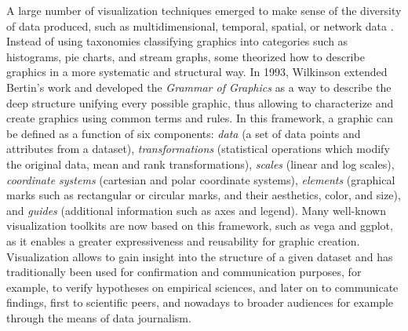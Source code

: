 A large number of visualization techniques emerged to make sense of the diversity of data produced, such as multidimensional, temporal, spatial, or network data \cite{shneidermanEyesHaveIt1996}.
Instead of using taxonomies classifying graphics into categories such as histograms, pie charts, and stream graphs, some theorized how to describe graphics in a more systematic and structural way.
In 1993, Wilkinson extended Bertin's work and developed the \textit{Grammar of Graphics} \cite{wilkinsonGrammarGraphics2005} as a way to describe the deep structure unifying every possible graphic, thus allowing to characterize and create graphics using common terms and rules.
In this framework, a graphic can be defined as a function of six components: \textsl{data} (a set of data points and attributes from a dataset), \textsl{transformations} (statistical operations which modify the original data, \eg mean and rank transformations),  \textsl{scales} (\eg linear and log scales),  \textsl{coordinate systems} (\eg cartesian and polar coordinate systems), \textsl{elements} (graphical marks such as rectangular or circular marks, and their aesthetics, \eg color, and size), and \textsl{guides} (additional information such as axes and legend).
Many well-known visualization toolkits are now based on this framework, such as vega\cite{satyanarayan2016vega} and ggplot\cite{wickham2007ggplot}, as it enables a greater expressiveness and reusability for graphic creation.
Visualization allows to gain insight into the structure of a given dataset and has traditionally been used for confirmation and communication purposes\cite{shneidermanInventingDiscoveryTools2002}, for example, to verify hypotheses on empirical sciences, and later on to communicate findings, first to scientific peers, and nowadays to broader audiences for example through the means of data journalism\cite{bradshawDataJournalism2017}.




